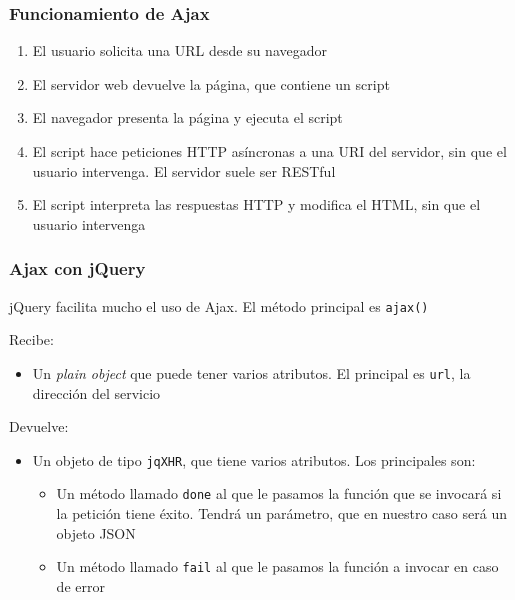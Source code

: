 \documentclass[ucs]{beamer}
\begin{document}
\begin{frame}[fragile]
\frametitle{Funcionamiento de Ajax}
\begin{enumerate}
\item
El usuario solicita una URL desde su navegador

\item
El servidor web devuelve la página, que contiene un script

\item
El navegador presenta la página y ejecuta el script

\item
El script hace peticiones HTTP asíncronas a una URI del servidor, sin que
el usuario intervenga. El servidor suele ser RESTful

\item
El script interpreta las respuestas HTTP y modifica el HTML, sin que
el usuario intervenga
\end{enumerate}
\end{frame}


\begin{frame}[fragile]
\frametitle{Ajax con jQuery}
jQuery facilita mucho el uso de Ajax. El método principal es \verb|ajax()|

Recibe:

\begin{itemize}
\item
Un \emph{plain object} que puede tener varios atributos. El principal es 
\verb|url|, la dirección del servicio
\end{itemize}

Devuelve:

    \begin{itemize}
\item
Un objeto de tipo \verb|jqXHR|, que tiene varios atributos. Los principales
son:


    \begin{itemize}
    \item
Un método
llamado \verb|done| al que le 
pasamos la función que se invocará si la petición tiene éxito. Tendrá un
parámetro, que en nuestro caso será un objeto JSON

    \item
Un método
llamado \verb|fail| al que le 
pasamos la función a invocar en caso de error
    \end{itemize}
    \end{itemize}




\end{frame}
\end{document}
